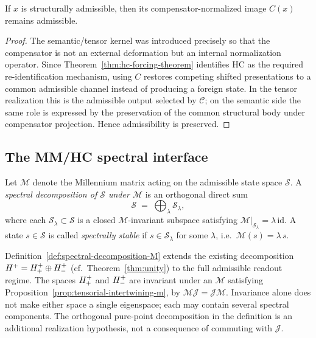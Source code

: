 \begin{lemma}
\label{lem:hc-admissibility-lemma}
If $x$ is structurally admissible, then its compensator-normalized image $C(x)$
remains admissible.
\end{lemma}

\begin{proof}
The semantic/tensor kernel was introduced precisely so that the compensator is
not an external deformation but an internal normalization operator. Since
Theorem~\ref{thm:hc-forcing-theorem} identifies HC as the required
re-identification mechanism, using $C$ restores competing shifted presentations
to a common admissible channel instead of producing a foreign state. In the
tensor realization this is the admissible output selected by $\mathcal C$; on
the semantic side the same role is expressed by the preservation of the common
structural body under compensator projection. Hence admissibility is preserved.
\end{proof}


\subsection{The MM/HC spectral interface}

\begin{definition}
\label{def:spectral-decomposition-M}
Let $\mathcal{M}$ denote the Millennium matrix acting on the admissible state
space $\mathcal{S}$. A \emph{spectral decomposition of $\mathcal{S}$ under
$\mathcal{M}$} is an orthogonal direct sum
\[
  \mathcal{S} \;=\; \bigoplus_{\lambda} \mathcal{S}_\lambda,
\]
where each $\mathcal{S}_\lambda \subset \mathcal{S}$ is a closed
$\mathcal{M}$-invariant subspace satisfying
$\mathcal{M}|_{\mathcal{S}_\lambda} = \lambda\,\mathrm{id}$.
A state $s \in \mathcal{S}$ is called \emph{spectrally stable} if
$s \in \mathcal{S}_\lambda$ for some $\lambda$, i.e.\ $\mathcal{M}(s) =
\lambda\,s$.
\end{definition}

\begin{remark}
Definition~\ref{def:spectral-decomposition-M} extends the existing
decomposition $H^+ = H^+_+ \oplus H^+_-$
(cf.\ Theorem~\ref{thm:unity}) to the full admissible readout regime.
The spaces $H^+_+$ and $H^+_-$ are invariant under an
$\mathcal{M}$ satisfying Proposition~\ref{prop:tensorial-intertwining-m},
by $\mathcal{M}\mathcal{J}=\mathcal{J}\mathcal{M}$. Invariance alone does
not make either space a single eigenspace; each may contain several
spectral components. The orthogonal pure-point decomposition in the
definition is an additional realization hypothesis, not a consequence
of commuting with $\mathcal J$.
\end{remark}


